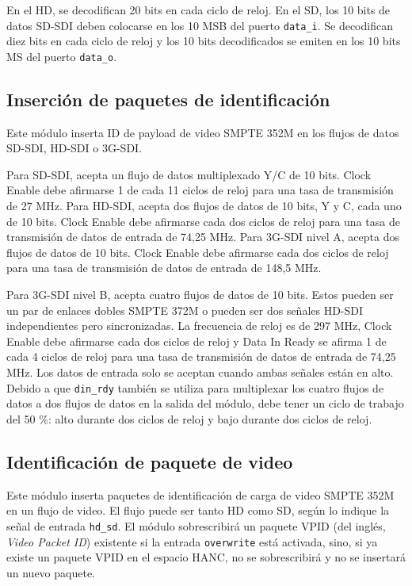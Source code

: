 En el HD, se decodifican 20 bits en cada ciclo de reloj. En el SD, los 10 bits
de datos SD-SDI deben colocarse en los 10 MSB del puerto \texttt{data\_i}. Se
decodifican diez bits en cada ciclo de reloj y los 10 bits decodificados se
emiten en los 10 bits MS del puerto \texttt{data\_o}.

\subsection{Inserción de paquetes de identificación}

Este módulo inserta ID de payload de video SMPTE 352M en los flujos de datos
SD-SDI, HD-SDI o 3G-SDI\@.

Para SD-SDI, acepta un flujo de datos multiplexado Y/C de 10 bits. Clock Enable
debe afirmarse 1 de cada 11 ciclos de reloj para una tasa de transmisión de 27
MHz. Para HD-SDI, acepta dos flujos de datos de 10 bits, Y y C, cada uno de
10 bits. Clock Enable debe afirmarse cada dos ciclos de reloj para una tasa de
transmisión de datos de entrada de 74,25 MHz. Para 3G-SDI nivel A, acepta dos
flujos de datos de 10 bits. Clock Enable debe afirmarse cada dos ciclos de
reloj para una tasa de transmisión de datos de entrada de 148,5 MHz.

Para 3G-SDI nivel B, acepta cuatro flujos de datos de 10 bits. Estos pueden ser
un par de enlaces dobles SMPTE 372M o pueden ser dos señales HD-SDI
independientes pero sincronizadas. La frecuencia de reloj es de 297 MHz,
Clock Enable debe afirmarse cada dos ciclos de reloj y Data In Ready se
afirma 1 de cada 4 ciclos de reloj para una tasa de transmisión de datos de
entrada de 74,25 MHz. Los datos de entrada solo se aceptan cuando ambas
señales están en alto. Debido a que \texttt{din\_rdy} también se utiliza para
multiplexar los cuatro flujos de datos a dos flujos de datos en la salida del
módulo, debe tener un ciclo de trabajo del 50 \%: alto durante dos ciclos de
reloj y bajo durante dos ciclos de reloj.

\subsection{Identificación de paquete de video}

Este módulo inserta paquetes de identificación de carga de video SMPTE 352M~\citep{st352} en
un flujo de video. El flujo puede ser tanto HD como SD, según lo indique la
señal de entrada \texttt{hd\_sd}. El módulo sobrescribirá un paquete VPID  (del inglés, \textit{Video Packet ID}) existente si la
entrada \texttt{overwrite} está activada, sino, si ya existe un paquete VPID en
el espacio HANC, no se sobrescribirá y no se insertará un nuevo paquete.

